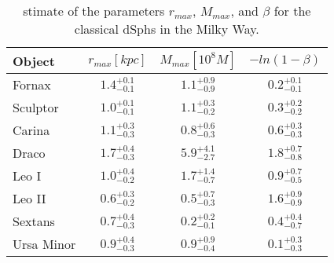 \documentclass{article}
\begin{document}
\begin{table}[h]
    \centering
    \begin{tabular}{l c c c}
    \hline
    Object & $r_{max}[kpc]$ & $M_{max}[10^8M]$ & $-ln(1-\beta)$\\
    \hline
    Fornax & $1.4^{+0.1}_{−0.1}$ & $1.1^{+0.9}_{−0.9}$ & $0.2^{+0.1}_{−0.1}$\\
    Sculptor & $1.0^{+0.1}_{−0.1}$ & $1.1^{+0.3}_{−0.2}$ & $0.3^{+0.2}_{−0.2}$\\
    Carina & $1.1^{+0.3}_{−0.3}$ & $0.8^{+0.6}_{−0.3}$ & $0.6^{+0.3}_{−0.3}$\\
    Draco & $1.7^{+0.4}_{−0.3}$ & $5.9^{+4.1}_{−2.7}$ & $1.8^{+0.7}_{−0.8}$\\
    Leo I & $1.0^{+0.4}_{−0.2}$ & $1.7^{+1.4}_{−0.7}$ & $0.9^{+0.7}_{−0.5}$\\
    Leo II & $0.6^{+0.3}_{−0.2}$ & $0.5^{+0.7}_{−0.3}$ & $1.6^{+0.9}_{−0.9}$\\
    Sextans & $0.7^{+0.4}_{−0.3}$ & $0.2^{+0.2}_{−0.1}$ & $0.4^{+0.4}_{−0.7}$\\
    Ursa Minor & $0.9^{+0.4}_{−0.3}$ & $0.9^{+0.9}_{−0.4}$ & $0.1^{+0.3}_{−0.3}$\\
    \hline
    \end{tabular}
    \caption{stimate of the parameters $r_{max}$, $M_{max}$, and $\beta$ for the classical dSphs in the Milky Way.}
    \label{TABLE:1}
\end{table}
\end{document}
